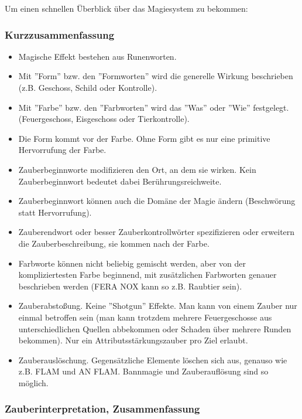 \documentclass{article}
\begin{document}
Um einen schnellen Überblick über das Magiesystem zu bekommen:

\subsubsection{Kurzzusammenfassung}

\begin{itemize}
\item Magische Effekt bestehen aus Runenworten.
\item Mit ''Form'' bzw. den ''Formworten'' wird die generelle Wirkung beschrieben (z.B. Geschoss, Schild oder Kontrolle).
\item Mit ''Farbe'' bzw. den ''Farbworten'' wird das ''Was'' oder ''Wie'' festgelegt. (Feuergeschoss, Eisgeschoss oder Tierkontrolle).
\item Die Form kommt vor der Farbe. Ohne Form gibt es nur eine primitive Hervorrufung der Farbe.
\item Zauberbeginnworte modifizieren den Ort, an dem sie wirken. Kein Zauberbeginnwort bedeutet dabei Berührungsreichweite.
\item Zauberbeginnwort können auch die Domäne der Magie ändern (Beschwörung statt Hervorrufung).
\item Zauberendwort oder besser Zauberkontrollwörter spezifizieren oder erweitern die Zauberbeschreibung, sie kommen nach der Farbe.
\item Farbworte können nicht beliebig gemischt werden, aber von der kompliziertesten Farbe beginnend, mit zusätzlichen Farbworten genauer beschrieben werden (FERA NOX kann so z.B. Raubtier sein).
\item Zauberabstoßung. Keine ''Shotgun'' Effekte. Man kann von einem Zauber nur einmal betroffen sein (man kann trotzdem mehrere Feuergeschosse aus unterschiedlichen Quellen abbekommen oder Schaden über mehrere Runden bekommen). Nur ein Attributsstärkungszauber pro Ziel erlaubt.
\item Zauberauslöschung. Gegensätzliche Elemente löschen sich aus, genauso wie z.B. FLAM und AN FLAM. Bannmagie und Zauberauflösung sind so möglich.
\end{itemize}

\subsubsection{Zauberinterpretation, Zusammenfassung}
\end{document}

